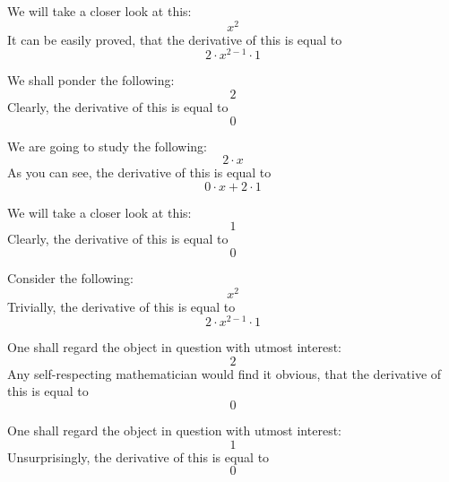 \documentclass{article}
\begin{document}
We will take a closer look at this:
\begin{equation}
x ^{2 } 
\end{equation}
It can be easily proved, that the derivative of this is equal to
\begin{equation}
2 \cdot x ^{2 - 1 } \cdot 1 
\end{equation}

We shall ponder the following:
\begin{equation}
2 
\end{equation}
Clearly, the derivative of this is equal to
\begin{equation}
0 
\end{equation}

We are going to study the following:
\begin{equation}
2 \cdot x 
\end{equation}
As you can see, the derivative of this is equal to
\begin{equation}
0 \cdot x + 2 \cdot 1 
\end{equation}

We will take a closer look at this:
\begin{equation}
1 
\end{equation}
Clearly, the derivative of this is equal to
\begin{equation}
0 
\end{equation}

Consider the following:
\begin{equation}
x ^{2 } 
\end{equation}
Trivially, the derivative of this is equal to
\begin{equation}
2 \cdot x ^{2 - 1 } \cdot 1 
\end{equation}

One shall regard the object in question with utmost interest:
\begin{equation}
2 
\end{equation}
Any self-respecting mathematician would find it obvious, that the derivative of this is equal to
\begin{equation}
0 
\end{equation}

One shall regard the object in question with utmost interest:
\begin{equation}
1 
\end{equation}
Unsurprisingly, the derivative of this is equal to
\begin{equation}
0 
\end{equation}
\end{document}
